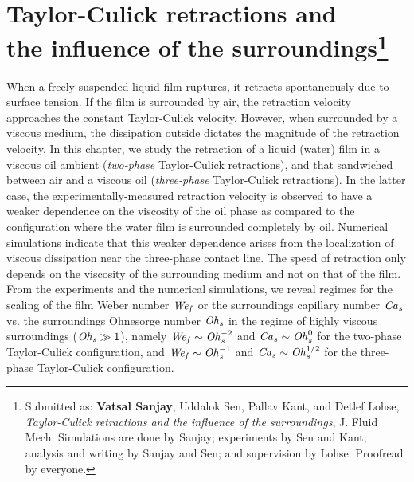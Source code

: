 \chapter[Taylor-Culick retractions and the influence of the surroundings]{Taylor-Culick retractions and \\ the influence of the surroundings\footnote{Submitted as: \textbf{Vatsal Sanjay}, Uddalok Sen, Pallav Kant, and Detlef Lohse, \textit{Taylor-Culick retractions and the influence of the surroundings}, J. Fluid Mech. Simulations are done by Sanjay; experiments by Sen and Kant; analysis and writing by Sanjay and Sen; and supervision by Lohse. Proofread by everyone.}}
\label{chap:TaylorCulick}

When a freely suspended liquid film ruptures, it retracts spontaneously due to surface tension. If the film is surrounded by air, the retraction velocity approaches the constant Taylor-Culick velocity. However, when surrounded by a viscous medium, the dissipation outside dictates the magnitude of the retraction velocity. In this chapter, we study the retraction of a liquid (water) film in a viscous oil ambient (\emph{two-phase} Taylor-Culick retractions), and that sandwiched between air and a viscous oil (\emph{three-phase} Taylor-Culick retractions). In the latter case, the experimentally-measured retraction velocity is observed to have a weaker dependence on the viscosity of the oil phase as compared to the configuration where the water film is surrounded completely by oil. Numerical simulations indicate that this weaker dependence arises from the localization of viscous dissipation near the three-phase contact line. The speed of retraction only depends on the viscosity of the surrounding medium and not on that of the film. From the experiments and the numerical simulations, we reveal regimes for the scaling of the film Weber number $\mathit{We}_\mathit{f}$ or the surroundings capillary number $\mathit{Ca}_\mathit{s}$ vs. the surroundings Ohnesorge number $\mathit{Oh}_\mathit{s}$ in the regime of highly viscous surroundings ($\mathit{Oh}_\mathit{s} \gg 1$), namely $\mathit{We}_\mathit{f} \sim \mathit{Oh}_\mathit{s}^{-2}$ and $\mathit{Ca}_\mathit{s} \sim \mathit{Oh}_\mathit{s}^{0}$ for the two-phase Taylor-Culick configuration, and $\mathit{We}_\mathit{f} \sim \mathit{Oh}_\mathit{s}^{-1}$ and $\mathit{Ca}_\mathit{s} \sim \mathit{Oh}_\mathit{s}^{1/2}$ for the three-phase Taylor-Culick configuration. 

\clearpage

